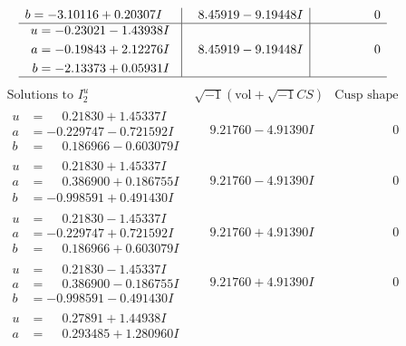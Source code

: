 \documentclass[1p]{elsarticle_modified}
\theoremstyle{definition}
\newcommand{\I}{\sqrt{-1}}
\begin{document}
$$\begin{array}{c|c|c}
\begin{aligned}
b &= -3.10116 + 0.20307 I\end{aligned}
 & \phantom{-}8.45919 - 9.19448 I & \phantom{-0.000000 } 0 \\ \hline\begin{aligned}
u &= -0.23021 - 1.43938 I \\
a &= -0.19843 + 2.12276 I \\
b &= -2.13373 + 0.05931 I\end{aligned}
 & \phantom{-}8.45919 - 9.19448 I & \phantom{-0.000000 } 0\\
 \hline 
 \end{array}$$\newpage$$\begin{array}{c|c|c}  
\text{Solutions to }I^u_{2}& \I (\text{vol} + \sqrt{-1}CS) & \text{Cusp shape}\\
 \hline 
\begin{aligned}
u &= \phantom{-}0.21830 + 1.45337 I \\
a &= -0.229747 - 0.721592 I \\
b &= \phantom{-}0.186966 - 0.603079 I\end{aligned}
 & \phantom{-}9.21760 - 4.91390 I & \phantom{-0.000000 } 0 \\ \hline\begin{aligned}
u &= \phantom{-}0.21830 + 1.45337 I \\
a &= \phantom{-}0.386900 + 0.186755 I \\
b &= -0.998591 + 0.491430 I\end{aligned}
 & \phantom{-}9.21760 - 4.91390 I & \phantom{-0.000000 } 0 \\ \hline\begin{aligned}
u &= \phantom{-}0.21830 - 1.45337 I \\
a &= -0.229747 + 0.721592 I \\
b &= \phantom{-}0.186966 + 0.603079 I\end{aligned}
 & \phantom{-}9.21760 + 4.91390 I & \phantom{-0.000000 } 0 \\ \hline\begin{aligned}
u &= \phantom{-}0.21830 - 1.45337 I \\
a &= \phantom{-}0.386900 - 0.186755 I \\
b &= -0.998591 - 0.491430 I\end{aligned}
 & \phantom{-}9.21760 + 4.91390 I & \phantom{-0.000000 } 0 \\ \hline\begin{aligned}
u &= \phantom{-}0.27891 + 1.44938 I \\
a &= \phantom{-}0.293485 + 1.280960 I \\

\end{aligned}
\end{array}$$
\end{document}
